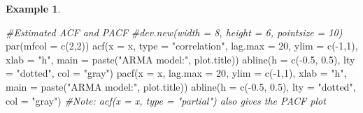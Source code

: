 \documentclass[
]{book}
\newenvironment{Shaded}{\begin{snugshade}}{\end{snugshade}}
\newcommand{\AttributeTok}[1]{\textcolor[rgb]{0.77,0.63,0.00}{#1}}
\newcommand{\CommentTok}[1]{\textcolor[rgb]{0.56,0.35,0.01}{\textit{#1}}}
\newcommand{\DecValTok}[1]{\textcolor[rgb]{0.00,0.00,0.81}{#1}}
\newcommand{\FloatTok}[1]{\textcolor[rgb]{0.00,0.00,0.81}{#1}}
\newcommand{\FunctionTok}[1]{\textcolor[rgb]{0.00,0.00,0.00}{#1}}
\newcommand{\NormalTok}[1]{#1}
\newcommand{\SpecialCharTok}[1]{\textcolor[rgb]{0.00,0.00,0.00}{#1}}
\newcommand{\StringTok}[1]{\textcolor[rgb]{0.31,0.60,0.02}{#1}}
\theoremstyle{definition}
\theoremstyle{definition}
\newtheorem{example}{Example}[chapter]
\theoremstyle{definition}
\theoremstyle{definition}
\theoremstyle{remark}
\begin{document}
\begin{example}
\begin{Shaded}
\begin{Highlighting}[]
 \CommentTok{\#Estimated ACF and PACF}
  \CommentTok{\#dev.new(width = 8, height = 6, pointsize = 10)}
  \FunctionTok{par}\NormalTok{(}\AttributeTok{mfcol =} \FunctionTok{c}\NormalTok{(}\DecValTok{2}\NormalTok{,}\DecValTok{2}\NormalTok{))}
  \FunctionTok{acf}\NormalTok{(}\AttributeTok{x =}\NormalTok{ x, }\AttributeTok{type =} \StringTok{"correlation"}\NormalTok{, }\AttributeTok{lag.max =} \DecValTok{20}\NormalTok{, }\AttributeTok{ylim =} \FunctionTok{c}\NormalTok{(}\SpecialCharTok{{-}}\DecValTok{1}\NormalTok{,}\DecValTok{1}\NormalTok{), }\AttributeTok{xlab =} \StringTok{"h"}\NormalTok{,}
    \AttributeTok{main =} \FunctionTok{paste}\NormalTok{(}\StringTok{"ARMA model:"}\NormalTok{, plot.title))}
  \FunctionTok{abline}\NormalTok{(}\AttributeTok{h =} \FunctionTok{c}\NormalTok{(}\SpecialCharTok{{-}}\FloatTok{0.5}\NormalTok{, }\FloatTok{0.5}\NormalTok{), }\AttributeTok{lty =} \StringTok{"dotted"}\NormalTok{, }\AttributeTok{col =} \StringTok{"gray"}\NormalTok{)}
  \FunctionTok{pacf}\NormalTok{(}\AttributeTok{x =}\NormalTok{ x, }\AttributeTok{lag.max =} \DecValTok{20}\NormalTok{, }\AttributeTok{ylim =} \FunctionTok{c}\NormalTok{(}\SpecialCharTok{{-}}\DecValTok{1}\NormalTok{,}\DecValTok{1}\NormalTok{), }\AttributeTok{xlab =} \StringTok{"h"}\NormalTok{,}
    \AttributeTok{main =} \FunctionTok{paste}\NormalTok{(}\StringTok{"ARMA model:"}\NormalTok{, plot.title))}
  \FunctionTok{abline}\NormalTok{(}\AttributeTok{h =} \FunctionTok{c}\NormalTok{(}\SpecialCharTok{{-}}\FloatTok{0.5}\NormalTok{, }\FloatTok{0.5}\NormalTok{), }\AttributeTok{lty =} \StringTok{"dotted"}\NormalTok{, }\AttributeTok{col =} \StringTok{"gray"}\NormalTok{)}
  \CommentTok{\#Note: acf(x = x, type = "partial") also gives the PACF plot}
  

\end{Highlighting}
\end{Shaded}
\end{example}
\end{document}
